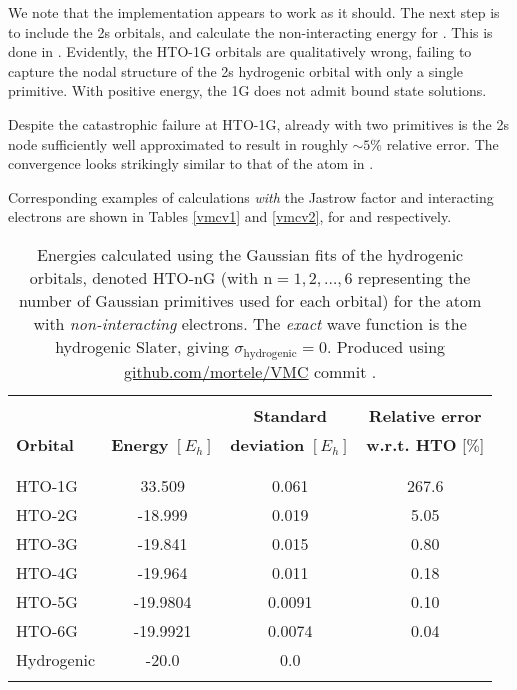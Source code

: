 \documentclass[../../master.tex]{subfiles}
\begin{document}
We note that the implementation appears to work as it should. The next step is to include the 2s orbitals, and calculate the non-interacting energy for . This is done in . Evidently, the HTO-1G orbitals are qualitatively wrong, failing to capture the nodal structure of the 2s hydrogenic orbital with only a single primitive. With positive energy, the 1G  does not admit bound state solutions. 

Despite the catastrophic failure at HTO-1G, already with two primitives is the 2s node sufficiently well approximated to result in roughly $\sim5\%$ relative error. The convergence looks strikingly similar to that of the  atom in . 

Corresponding examples of calculations \emph{with} the Jastrow factor and interacting electrons are shown in Tables \ref{vmcv1} and \ref{vmcv2}, for  and  respectively.

\begin{table}
\centering{}
\setlength\extrarowheight{2pt}
\begin{tabularx}{\textwidth}{X *{3}{S[table-format=-1.3,table-space-text-post=***]}}
\hline
\hline
\\[-0.9em]
                 &                          & \phantom{-}\textbf{Standard}          & \textbf{Relative error}    \\
\textbf{Orbital} & \textbf{Energy} $[E_h]$  & \textbf{deviation} $[E_h]$ & \textbf{w.r.t. HTO} [$\%$]  \\
\\[-0.9em]
\hline
\\[-0.9em]
HTO-1G &  33.509   & 0.061   &  267.6 \\
HTO-2G & -18.999   & 0.019   &  5.05 \\
HTO-3G & -19.841   & 0.015   &  0.80 \\
HTO-4G & -19.964   & 0.011   &  0.18 \\
HTO-5G & -19.9804  & 0.0091  &  0.10 \\
HTO-6G & -19.9921  & 0.0074  &  0.04 \\
Hydrogenic    & -20.0    & 0.0 & \\
\\[-0.9em]
\hline
\end{tabularx}
\caption{Energies calculated using the Gaussian fits of the hydrogenic orbitals, denoted HTO-nG (with $\text{n}=1,2,\dots,6$ representing the number of Gaussian primitives used for each orbital) for the  atom with \emph{non-interacting} electrons. The \emph{exact} wave function is the hydrogenic Slater, giving $\sigma_\text{hydrogenic}=0$. Produced using \url{github.com/mortele/VMC} commit . \label{tab:vmcgaussnonint2}}
\end{table}
\end{document}
